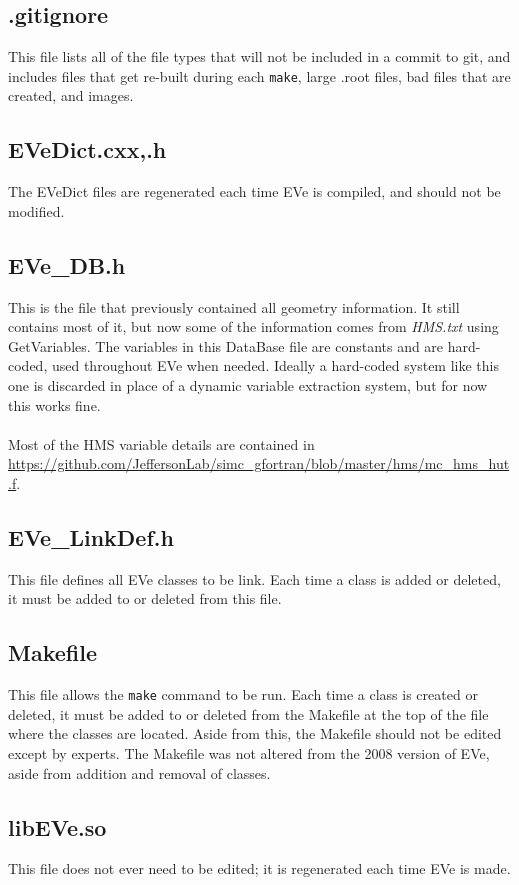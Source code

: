 \documentclass[12pt]{article}
\numberwithin{equation}{section}
\begin{document}
\subsection{.gitignore}
This file lists all of the file types that will not be included in a commit to git, and includes files that get re-built during each \texttt{make}, large .root files, bad files that are created, and images.

\subsection{EVeDict.cxx,.h}
The EVeDict files are regenerated each time EVe is compiled, and should not be modified.

\subsection{EVe\_DB.h}
This is the file that previously contained all geometry information. It still contains most of it, but now some of the information comes from \textit{HMS.txt} using GetVariables. The variables in this DataBase file are constants and are hard-coded, used throughout EVe when needed. Ideally a hard-coded system like this one is discarded in place of a dynamic variable extraction system, but for now this works fine.
\\
\\
Most of the HMS variable details are contained in \url{https://github.com/JeffersonLab/simc_gfortran/blob/master/hms/mc_hms_hut.f}.

\subsection{EVe\_LinkDef.h}
This file defines all EVe classes to be link. Each time a class is added or deleted, it must be added to or deleted from this file.

\subsection{Makefile}
This file allows the \texttt{make} command to be run. Each time a class is created or deleted, it must be added to or deleted from the Makefile at the top of the file where the classes are located. Aside from this, the Makefile should not be edited except by experts. The Makefile was not altered from the 2008 version of EVe, aside from addition and removal of classes.

\subsection{libEVe.so}
This file does not ever need to be edited; it is regenerated each time EVe is made.
\end{document}
